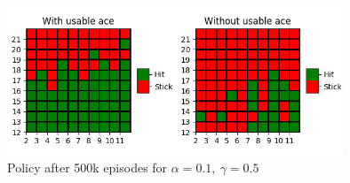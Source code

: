 \documentclass{article}
\begin{document}
    \begin{figure}[h]
        \centering
        \includegraphics[width=10cm]{plots/ql_policy_500k.png}
        \caption{Policy after 500k episodes for $\alpha=0.1,\ \gamma=0.5$}
    \end{figure}
\end{document}
